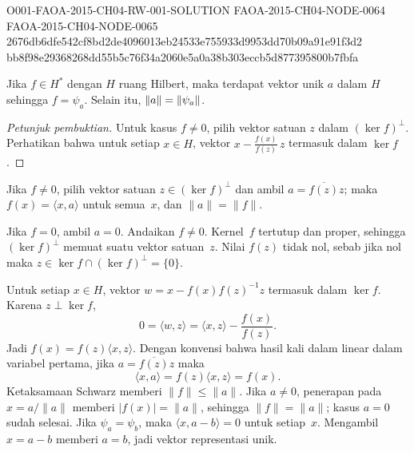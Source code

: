 \begin{o001readerwork}
  {O001-FAOA-2015-CH04-RW-001-SOLUTION}
  {FAOA-2015-CH04-NODE-0064}
  {FAOA-2015-CH04-NODE-0065}
  {2676db6dfe542cf8bd2de4096013eb24533e755933d9953dd70b09a91e91f3d2}
  {bb8f98e29368268dd55b5c76f34a2060e5a0a38b303eccb5d877395800b7fbfa}
\begin{o001result}
\begin{thm}\label{000342} Jika $f \in H^*$ dengan $H$ ruang Hilbert,
maka terdapat vektor unik $a$ dalam $H$ sehingga $f = \psi_a$. Selain itu,
$\lVert a\rVert = \lVert\psi_a\rVert$.
\end{thm}
\end{o001result}
\begin{o001sourcehint}
\begin{proof}[\emph{Petunjuk pembuktian}] Untuk kasus $f \ne 0$, pilih vektor satuan $z$ dalam $(\ker f)^\perp$.
Perhatikan bahwa untuk setiap $x \in H$, vektor $x - \frac{f(x)}{f(z)}\,z$ termasuk dalam $\ker f$. \ns
\end{proof}
\end{o001sourcehint}
\begin{o001answer}
Jika $f\neq0$, pilih vektor satuan $z\in(\ker f)^\perp$ dan ambil
$a=\overline{f(z)}z$; maka $f(x)=\langle x,a\rangle$ untuk semua~$x$, dan
$\|a\|=\|f\|$.
\end{o001answer}
\begin{o001proof}
Jika $f=0$, ambil $a=0$. Andaikan $f\neq0$. Kernel~$f$ tertutup dan proper,
sehingga $(\ker f)^\perp$ memuat suatu vektor satuan~$z$. Nilai $f(z)$ tidak
nol, sebab jika nol maka $z\in\ker f\cap(\ker f)^\perp=\{0\}$.

Untuk setiap $x\in H$, vektor
$w=x-f(x)f(z)^{-1}z$ termasuk dalam $\ker f$. Karena $z\perp\ker f$,
\[
 0=\langle w,z\rangle
  =\langle x,z\rangle-\frac{f(x)}{f(z)}.
\]
Jadi $f(x)=f(z)\langle x,z\rangle$. Dengan konvensi bahwa hasil kali dalam
linear dalam variabel pertama, jika $a=\overline{f(z)}z$ maka
\[
 \langle x,a\rangle=f(z)\langle x,z\rangle=f(x).
\]
Ketaksamaan Schwarz memberi $\|f\|\leq\|a\|$. Jika $a\neq0$, penerapan pada
$x=a/\|a\|$ memberi $|f(x)|=\|a\|$, sehingga $\|f\|=\|a\|$; kasus
$a=0$ sudah selesai. Jika $\psi_a=\psi_b$, maka
$\langle x,a-b\rangle=0$ untuk setiap~$x$. Mengambil $x=a-b$ memberi
$a=b$, jadi vektor representasi unik.
\end{o001proof}
\end{o001readerwork}

